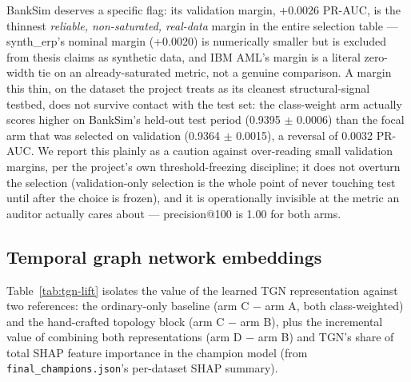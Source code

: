 BankSim deserves a specific flag: its validation margin, +0.0026 PR-AUC, is the thinnest \emph{reliable, non-saturated, real-data} margin in the entire selection table --- synth\_erp's nominal margin (+0.0020) is numerically smaller but is excluded from thesis claims as synthetic data, and IBM AML's margin is a literal zero-width tie on an already-saturated metric, not a genuine comparison. A margin this thin, on the dataset the project treats as its cleanest structural-signal testbed, does not survive contact with the test set: the class-weight arm actually scores higher on BankSim's held-out test period (0.9395 $\pm$ 0.0006) than the focal arm that was selected on validation (0.9364 $\pm$ 0.0015), a reversal of 0.0032 PR-AUC. We report this plainly as a caution against over-reading small validation margins, per the project's own threshold-freezing discipline; it does not overturn the selection (validation-only selection is the whole point of never touching test until after the choice is frozen), and it is operationally invisible at the metric an auditor actually cares about --- precision@100 is 1.00 for both arms.

\subsection{Temporal graph network embeddings}

Table~\ref{tab:tgn-lift} isolates the value of the learned TGN representation against two references: the ordinary-only baseline (arm C $-$ arm A, both class-weighted) and the hand-crafted topology block (arm C $-$ arm B), plus the incremental value of combining both representations (arm D $-$ arm B) and TGN's share of total SHAP feature importance in the champion model (from \texttt{final\_champions.json}'s per-dataset SHAP summary).

\begin{table}[t]
\centering
\caption{TGN embeddings vs.\ hand-crafted topology, 3-seed test PR-AUC deltas (class-weighted arms only) and TGN's share of total SHAP importance in the champion model. $^\dagger$synth\_erp is non-evidentiary.}
\label{tab:tgn-lift}
\end{table}

